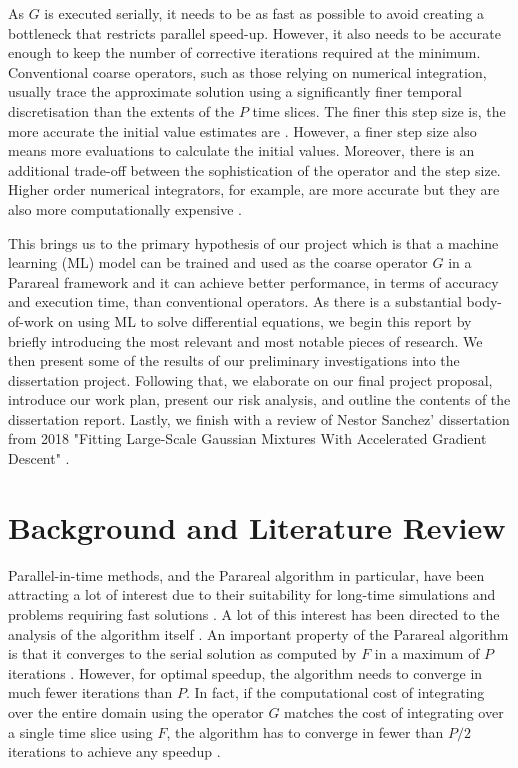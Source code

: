 \documentclass{article}
\begin{document}
As $G$ is executed serially, it needs to be as fast as possible to avoid creating a bottleneck that restricts parallel speed-up. However, it also needs to be accurate enough to keep the number of corrective iterations required at the minimum. Conventional coarse operators, such as those relying on numerical integration, usually trace the approximate solution using a significantly finer temporal discretisation than the extents of the $P$ time slices. The finer this step size is, the more accurate the initial value estimates are \cite[p.~319-320]{suli2003}. However, a finer step size also means more evaluations to calculate the initial values. Moreover, there is an additional trade-off between the sophistication of the operator and the step size. Higher order numerical integrators, for example, are more accurate but they are also more computationally expensive \cite[p.~325]{suli2003}.

This brings us to the primary hypothesis of our project which is that a machine learning (ML) model can be trained and used as the coarse operator $G$ in a Parareal framework and it can achieve better performance, in terms of accuracy and execution time, than conventional operators. As there is a substantial body-of-work on using ML to solve differential equations, we begin this report by briefly introducing the most relevant and most notable pieces of research. We then present some of the results of our preliminary investigations into the dissertation project. Following that, we elaborate on our final project proposal, introduce our work plan, present our risk analysis, and outline the contents of the dissertation report. Lastly, we finish with a review of Nestor Sanchez' dissertation from 2018 "Fitting Large-Scale Gaussian Mixtures With Accelerated Gradient Descent" \cite{sanchez2018}.

\section{Background and Literature Review}

Parallel-in-time methods, and the Parareal algorithm in particular, have been attracting a lot of interest due to their suitability for long-time simulations and problems requiring fast solutions \cite{gurrala2015}. A lot of this interest has been directed to the analysis of the algorithm itself \cite{staff2003} \cite{gander2007}. An important property of the Parareal algorithm is that it converges to the serial solution as computed by $F$ in a maximum of $P$ iterations \cite[p.~6-7]{staff2003}. However, for optimal speedup, the algorithm needs to converge in much fewer iterations than $P$. In fact, if the computational cost of integrating over the entire domain using the operator $G$ matches the cost of integrating over a single time slice using $F$, the algorithm has to converge in fewer than $P / 2$ iterations to achieve any speedup \cite[p.~7]{staff2003}.
\end{document}

